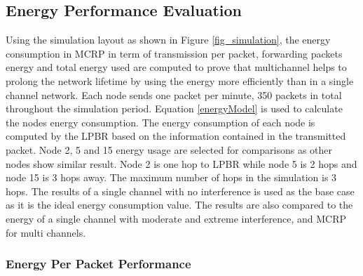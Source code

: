 \subsection{Energy Performance Evaluation}


Using the simulation layout as shown in Figure \ref{fig_simulation}, the energy consumption in MCRP in term of transmission per packet, forwarding packets energy and total energy used are computed to prove that multichannel helps to prolong the network lifetime by using the energy more efficiently than in a single channel network. Each node sends one packet per minute, 350 packets in total throughout the simulation period. Equation \ref{energyModel} is used to calculate the nodes energy consumption. The energy consumption of each node is computed by the LPBR based on the information contained in the transmitted packet. Node 2, 5 and 15 energy usage are selected for comparisons as other nodes show similar result. Node 2 is one hop to LPBR while node 5 is 2 hops and node 15 is 3 hops away. The maximum number of hops in the simulation is 3 hops. The results of a single channel with no interference is used as the base case as it is the ideal energy consumption value. The results are also compared to the energy of a single channel with moderate and extreme interference, and MCRP for multi channels.

\subsubsection{Energy Per Packet Performance}

